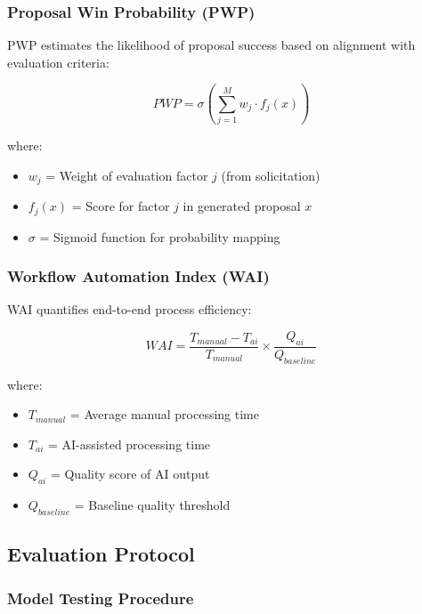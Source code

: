 \documentclass[11pt,a4paper]{article}
\begin{document}
\subsubsection{Proposal Win Probability (PWP)}

PWP estimates the likelihood of proposal success based on alignment with evaluation criteria:

\begin{equation}
PWP = \sigma\left(\sum_{j=1}^{M} w_j \cdot f_j(x)\right)
\end{equation}

where:
\begin{itemize}
    \item $w_j$ = Weight of evaluation factor $j$ (from solicitation)
    \item $f_j(x)$ = Score for factor $j$ in generated proposal $x$
    \item $\sigma$ = Sigmoid function for probability mapping
\end{itemize}

\subsubsection{Workflow Automation Index (WAI)}

WAI quantifies end-to-end process efficiency:

\begin{equation}
WAI = \frac{T_{manual} - T_{ai}}{T_{manual}} \times \frac{Q_{ai}}{Q_{baseline}}
\end{equation}

where:
\begin{itemize}
    \item $T_{manual}$ = Average manual processing time
    \item $T_{ai}$ = AI-assisted processing time
    \item $Q_{ai}$ = Quality score of AI output
    \item $Q_{baseline}$ = Baseline quality threshold
\end{itemize}

\subsection{Evaluation Protocol}

\subsubsection{Model Testing Procedure}
\end{document}
